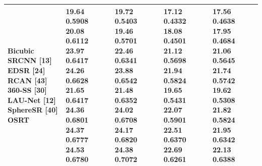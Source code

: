 \begin{tabular}{lllll}
\toprule
Bicubic SRCNN [13] EDSR [24] RCAN [43] 360-SS [30] LAU-Net [12] SphereSR [40] OSRT & 19.64 0.5908 20.08 0.6112 23.97 0.6417 24.26 0.6628 21.65 0.6417 24.36 0.6801 24.37 0.6777 24.53 0.6780 & 19.72 0.5403 19.46 0.5701 22.46 0.6341 23.88 0.6542 21.48 0.6352 24.02 0.6708 24.17 0.6820 24.38 0.7072 & 17.12 0.4332 18.08 0.4501 21.12 0.5698 21.94 0.5824 19.65 0.5431 22.07 0.5901 22.51 0.6370 22.69 0.6261 & 17.56 0.4638 17.95 0.4684 21.06 0.5645 21.74 0.5742 19.62 0.5308 21.82 0.5824 21.95 0.6342 22.13 0.6388 \\
\midrule
\bottomrule
\end{tabular}

